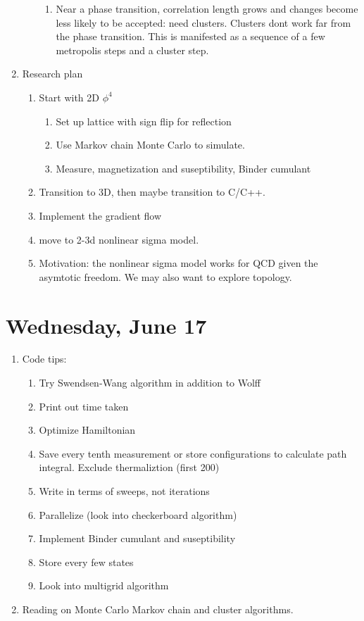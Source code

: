 \documentclass[english]{article}
\begin{document}
\begin{enumerate}
\begin{enumerate}
\begin{enumerate}
            \item Near a phase transition, correlation length grows and changes become less likely to be accepted: need clusters. Clusters dont work far from the phase transition. This is manifested as a sequence of a few metropolis steps and a cluster step.
        \end{enumerate}
    \end{enumerate}
    \item Research plan
    \begin{enumerate}
        \item Start with 2D $\phi^4$
        \begin{enumerate}
            \item Set up lattice with sign flip for reflection
            \item Use Markov chain Monte Carlo to simulate.
            \item Measure, magnetization and suseptibility, Binder cumulant
        \end{enumerate}
        \item Transition to 3D, then maybe transition to C/C++.
        \item Implement the gradient flow
        \item move to 2-3d nonlinear sigma model. 
        \item Motivation: the nonlinear sigma model works for QCD given the asymtotic freedom. We may also want to explore topology.


    \end{enumerate}
\end{enumerate}


\section{Wednesday, June 17}
\begin{enumerate}
    \item Code tips:
    \begin{enumerate}
        \item Try Swendsen-Wang algorithm in addition to Wolff
        \item Print out time taken
        \item Optimize Hamiltonian
        \item Save every tenth measurement or store configurations to calculate path integral. Exclude thermaliztion (first 200)
        \item Write in terms of sweeps, not iterations
        \item Parallelize (look into checkerboard algorithm)
        \item Implement Binder cumulant and suseptibility
        \item Store every few states
        \item Look into multigrid algorithm

    \end{enumerate}

    \item Reading on Monte Carlo Markov chain and cluster algorithms.
\end{enumerate}

\nocite{*}


\end{document}
